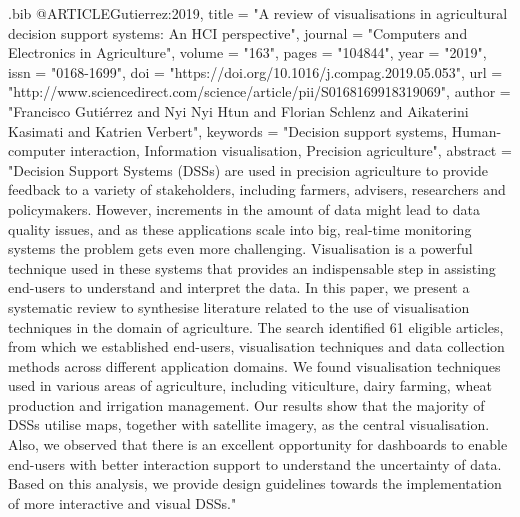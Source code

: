 \begin{filecontents}{\jobname.bib}
@ARTICLE{Gutierrez:2019,
  title = "A review of visualisations in agricultural decision support systems: An {HCI} perspective",
  journal = "Computers and Electronics in Agriculture",
  volume = "163",
  pages = "104844",
  year = "2019",
  issn = "0168-1699",
  doi = "https://doi.org/10.1016/j.compag.2019.05.053",
  url = "http://www.sciencedirect.com/science/article/pii/S0168169918319069",
  author = "Francisco Gutiérrez and Nyi Nyi Htun and Florian Schlenz and Aikaterini Kasimati and Katrien Verbert",
  keywords = "Decision support systems, Human-computer interaction, Information visualisation, Precision agriculture",
  abstract = "Decision Support Systems (DSSs) are used in precision agriculture to provide feedback to a variety of stakeholders, including farmers, advisers, researchers and policymakers. However, increments in the amount of data might lead to data quality issues, and as these applications scale into big, real-time monitoring systems the problem gets even more challenging. Visualisation is a powerful technique used in these systems that provides an indispensable step in assisting end-users to understand and interpret the data. In this paper, we present a systematic review to synthesise literature related to the use of visualisation techniques in the domain of agriculture. The search identified 61 eligible articles, from which we established end-users, visualisation techniques and data collection methods across different application domains. We found visualisation techniques used in various areas of agriculture, including viticulture, dairy farming, wheat production and irrigation management. Our results show that the majority of DSSs utilise maps, together with satellite imagery, as the central visualisation. Also, we observed that there is an excellent opportunity for dashboards to enable end-users with better interaction support to understand the uncertainty of data. Based on this analysis, we provide design guidelines towards the implementation of more interactive and visual DSSs."
}


\end{filecontents}
